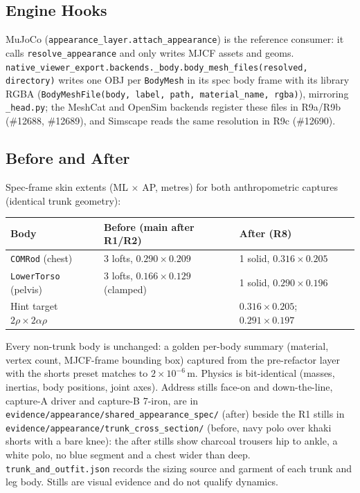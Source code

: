 \subsection{Engine Hooks}
MuJoCo (\texttt{appearance\_layer.attach\_appearance}) is the reference
consumer: it calls \texttt{resolve\_appearance} and only writes MJCF assets and
geoms. \texttt{native\_viewer\_export.backends.\_body.body\_mesh\_files(resolved,
directory)} writes one OBJ per \texttt{BodyMesh} in its spec body frame with
its library RGBA (\texttt{BodyMeshFile(body, label, path, material\_name,
rgba)}), mirroring \texttt{\_head.py}; the MeshCat and OpenSim backends register
these files in R9a/R9b (\#12688, \#12689), and Simscape reads the same
resolution in R9c (\#12690).

\subsection{Before and After}
Spec-frame skin extents (ML $\times$ AP, metres) for both anthropometric captures
(identical trunk geometry):
\begin{center}
\begin{tabular}{lll}
Body & Before (main after R1/R2) & After (R8) \\ \hline
\texttt{COMRod} (chest) & 3 lofts, $0.290\times0.209$ & 1 solid, $0.316\times0.205$ \\
\texttt{LowerTorso} (pelvis) & 3 lofts, $0.166\times0.129$ (clamped) & 1 solid, $0.290\times0.196$ \\
Hint target $2\rho\times2\alpha\rho$ & & $0.316\times0.205$; $0.291\times0.197$ \\
\end{tabular}
\end{center}
Every non-trunk body is unchanged: a golden per-body summary (material, vertex
count, MJCF-frame bounding box) captured from the pre-refactor layer with the
shorts preset matches to $2\times10^{-6}$\,m. Physics is bit-identical (masses,
inertias, body positions, joint axes). Address stills face-on and
down-the-line, capture-A driver and capture-B 7-iron, are in
\texttt{evidence/appearance/shared\_appearance\_spec/} (after) beside the R1
stills in \texttt{evidence/appearance/trunk\_cross\_section/} (before, navy
polo over khaki shorts with a bare knee): the after stills show charcoal
trousers hip to ankle, a white polo, no blue segment and a chest wider than
deep. \texttt{trunk\_and\_outfit.json} records the sizing source and garment
of each trunk and leg body. Stills are visual evidence and do not qualify
dynamics.

